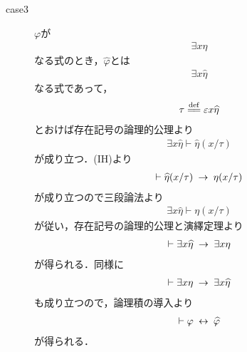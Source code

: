 \begin{sketch}
\begin{description}
\begin{description}
				\item[case3] $\varphi$が
					\begin{align}
						\exists x \eta
					\end{align}
					なる式のとき，$\widehat{\varphi}$とは
					\begin{align}
						\exists x \widehat{\eta}
					\end{align}
					なる式であって，
					\begin{align}
						\tau \defeq \varepsilon x \widehat{\eta}
					\end{align}
					とおけば存在記号の論理的公理より
					\begin{align}
						\exists x \widehat{\eta} \vdash \widehat{\eta}(x/\tau)
					\end{align}
					が成り立つ．(IH)より
					\begin{align}
						\vdash \widehat{\eta}(x/\tau) \hspace{0.25em}\rightarrow\hspace{0.25em} \eta(x/\tau)
					\end{align}
					が成り立つので三段論法より
					\begin{align}
						\exists x \widehat{\eta} \vdash \eta(x/\tau)
					\end{align}
					が従い，存在記号の論理的公理と演繹定理より
					\begin{align}
						\vdash \exists x \widehat{\eta} \hspace{0.25em}\rightarrow\hspace{0.25em} \exists x \eta
					\end{align}
					が得られる．同様に
					\begin{align}
						\vdash \exists x \eta \hspace{0.25em}\rightarrow\hspace{0.25em} \exists x \widehat{\eta}
					\end{align}
					も成り立つので，論理積の導入より
					\begin{align}
						\vdash \varphi \hspace{0.25em}\leftrightarrow\hspace{0.25em} \widehat{\varphi}
					\end{align}
					が得られる．
					

\end{description}
\end{description}
\end{sketch}
